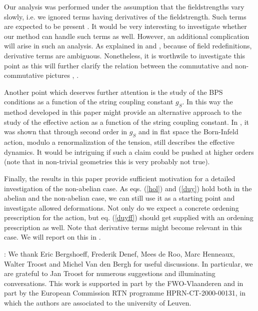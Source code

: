 \documentclass[a4paper,12pt,oneside]{article}
\begin{document}
Our analysis was performed under the assumption that the fieldstrengths
vary slowly, i.e. we ignored terms having derivatives of the
fieldstrength. Such terms are expected to be present \cite{AT}. It would
be very interesting to investigate whether our method can handle such
terms as well. However, an additional complication will arise in such an
analysis. As explained in \cite{AT2} and \cite{GW}, because of field
redefinitions, derivative terms are ambiguous. Nonetheless, it is
worthwile to investigate this point as this will further clarify the
relation between the commutative and non-commutative pictures \cite{SW},
\cite{CS}.

Another point which deserves further attention is the study of the BPS
conditions as a function of the string coupling constant $g_S$. In this
way the method developed in this paper might provide an alternative
approach to the study of the effective action as a function of the string
coupling constant. In \cite{AT2}, it was shown that through second order
in $g_S$ and in flat space the Born-Infeld action, modulo a
renormalization of the tension, still describes the effective dynamics.
It would be intriguing if such a claim could be pushed at higher orders
(note that in non-trivial geometries this is very probably not true).

Finally, the results in this paper provide sufficient motivation for a
detailed investigation of the non-abelian case. As eqs. (\ref{hol}) and
(\ref{duy}) hold both in the abelian and the non-abelian case, we can
still use it as a starting point and investigate allowed deformations.
Not only do we expect a concrete ordening prescription for the action,
but eq. (\ref{duyff}) should get supplied with an ordening prescription
as well. Note that derivative terms might become relevant in this case.
We will report on this in \cite{wij}.

\vspace{5mm}

:
We thank Eric Bergshoeff, Frederik Denef, Mees de Roo, Marc Henneaux,
Walter Troost and Michel Van den Bergh for useful discussions. In
particular, we are grateful to Jan Troost for numerous suggestions and
illuminating conversations. This work is supported in part by the
FWO-Vlaanderen and in part by the European Commission RTN programme
HPRN-CT-2000-00131, in which the authors are associated to the university
of Leuven.

\vspace{5mm}
\end{document}
